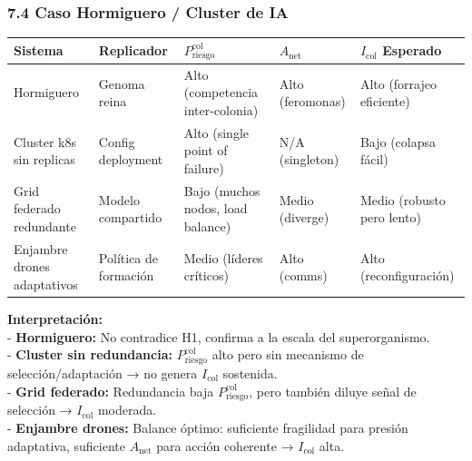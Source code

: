 \subsubsection{7.4 Caso Hormiguero / Cluster de
IA}\label{caso-hormiguero-cluster-de-ia}

{\def\LTcaptype{none} %
\begin{longtable}[]{@{}
  >{\raggedright\arraybackslash}p{}
  >{\raggedright\arraybackslash}p{}
  >{\raggedright\arraybackslash}p{}
  >{\raggedright\arraybackslash}p{}
  >{\raggedright\arraybackslash}p{}@{}}
\toprule\noalign{}
\begin{minipage}[b]{\linewidth}\raggedright
\textbf{Sistema}
\end{minipage} & \begin{minipage}[b]{\linewidth}\raggedright
\textbf{Replicador}
\end{minipage} & \begin{minipage}[b]{\linewidth}\raggedright
\(P_{\text{riesgo}}^{\text{col}}\)
\end{minipage} & \begin{minipage}[b]{\linewidth}\raggedright
\(A_{\text{net}}\)
\end{minipage} & \begin{minipage}[b]{\linewidth}\raggedright
\(I_{\text{col}}\) Esperado
\end{minipage} \\
\midrule\noalign{}
\endhead
\bottomrule\noalign{}
\endlastfoot
Hormiguero & Genoma reina & Alto (competencia inter-colonia) & Alto
(feromonas) & Alto (forrajeo eficiente) \\
Cluster k8s sin replicas & Config deployment & Alto (single point of
failure) & N/A (singleton) & Bajo (colapsa fácil) \\
Grid federado redundante & Modelo compartido & Bajo (muchos nodos, load
balance) & Medio (diverge) & Medio (robusto pero lento) \\
Enjambre drones adaptativos & Política de formación & Medio (líderes
críticos) & Alto (comms) & Alto (reconfiguración) \\
\end{longtable}
}

\textbf{Interpretación:}\\
- \textbf{Hormiguero:} No contradice H1, confirma a la escala del
superorganismo.\\
- \textbf{Cluster sin redundancia:} \(P_{\text{riesgo}}^{\text{col}}\)
alto pero sin mecanismo de selección/adaptación → no genera
\(I_{\text{col}}\) sostenida.\\
- \textbf{Grid federado:} Redundancia baja
\(P_{\text{riesgo}}^{\text{col}}\), pero también diluye señal de
selección → \(I_{\text{col}}\) moderada.\\
- \textbf{Enjambre drones:} Balance óptimo: suficiente fragilidad para
presión adaptativa, suficiente \(A_{\text{net}}\) para acción coherente
→ \(I_{\text{col}}\) alta.

